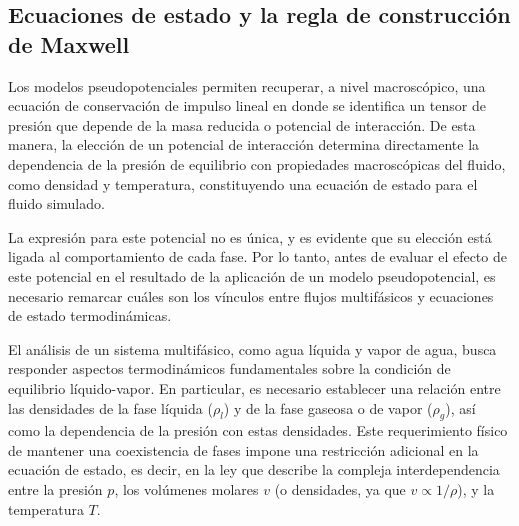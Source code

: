 \subsection{Ecuaciones de estado y la regla de construcci\'on de Maxwell}
\label{sec:EOS}

Los modelos pseudopotenciales permiten recuperar, a nivel macrosc\'opico, una ecuaci\'on de conservaci\'on de impulso lineal en donde se identifica un tensor de presi\'on que depende de la masa reducida o potencial de interacci\'on. De esta manera, la elecci\'on de un potencial de interacci\'on determina directamente la dependencia de la presi\'on de equilibrio con propiedades macrosc\'opicas del fluido, como densidad y temperatura, constituyendo una ecuaci\'on de estado para el fluido simulado. 

La expresi\'on para este potencial no es \'unica, y es evidente que su elecci\'on est\'a ligada al comportamiento de cada fase. Por lo tanto, antes de evaluar el efecto de este potencial en el resultado de la aplicaci\'on de un modelo pseudopotencial, es necesario remarcar cu\'ales son los v\'inculos entre flujos multif\'asicos y ecuaciones de estado termodin\'amicas.

El an\'alisis de un sistema multif\'asico, como agua l\'iquida y vapor de agua, busca responder aspectos termodin\'amicos fundamentales sobre la condici\'on de equilibrio l\'iquido-vapor. En particular, es necesario establecer una relaci\'on entre las densidades de la fase l\'iquida ($\rho_l$) y de la fase gaseosa o de vapor ($\rho_g$), as\'i como la dependencia de la presi\'on con estas densidades. Este requerimiento f\'isico de mantener una coexistencia de fases impone una restricci\'on adicional en la ecuaci\'on de estado, es decir, en la ley que describe la compleja interdependencia entre la presi\'on $p$, los vol\'umenes molares $v$ (o densidades, ya que $v \propto 1/\rho$), y la temperatura $T$. 


